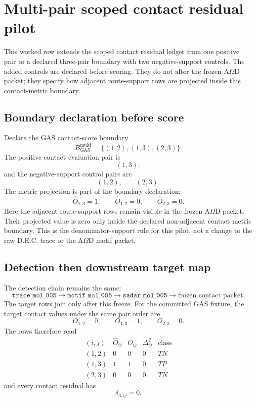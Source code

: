 \section{Multi-pair scoped contact residual pilot}

This worked row extends the scoped contact residual ledger from one positive pair to a declared three-pair boundary with two negative-support controls. The added controls are declared before scoring. They do not alter the frozen A$\Omega$D packet; they specify how adjacent route-support rows are projected inside this contact-metric boundary.

\subsection{Boundary declaration before score}

Declare the GAS contact-score boundary
\[
B_{\mathrm{GAS}}^{\mathrm{multi}}
=
\{(1,2),(1,3),(2,3)\}.
\]
The positive contact evaluation pair is
\[
(1,3),
\]
and the negative-support control pairs are
\[
(1,2),\qquad (2,3).
\]
The metric projection is part of the boundary declaration:
\[
\widehat O_{1,3}=1,
\qquad
\widehat O_{1,2}=0,
\qquad
\widehat O_{2,3}=0.
\]
Here the adjacent route-support rows remain visible in the frozen A$\Omega$D packet. Their projected value is zero only inside the declared non-adjacent contact metric boundary. This is the denominator-support rule for this pilot, not a change to the raw D.E.C. trace or the A$\Omega$D motif packet.

\subsection{Detection then downstream target map}

The detection chain remains the same:
\[
\texttt{trace\_mol\_005}
\longrightarrow
\texttt{motif\_mol\_005}
\longrightarrow
\texttt{sadar\_mol\_005}
\longrightarrow
\text{frozen contact packet}.
\]
The target rows join only after this freeze. For the committed GAS fixture, the target contact values under the same pair order are
\[
O_{1,2}=0,\qquad O_{1,3}=1,\qquad O_{2,3}=0.
\]
The rows therefore read
\[
\begin{array}{c|c|c|c|c}
(i,j)&\widehat O_{ij}&O_{ij}&\Delta^{\mathbb Z}_{ij}&\text{class}\\
\hline
(1,2)&0&0&0&TN\\
(1,3)&1&1&0&TP\\
(2,3)&0&0&0&TN
\end{array}
\]
and every contact residual has
\[
\delta_{3,ij}=0.
\]

